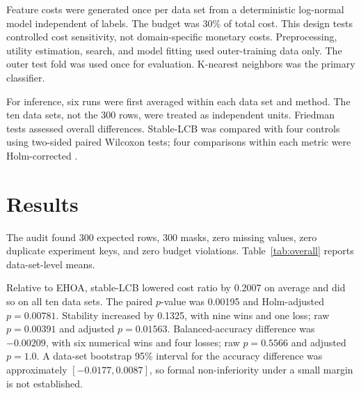 \documentclass[10pt,journal,a4paper]{IEEEtran}
\begin{document}
Feature costs were generated once per data set from a deterministic log-normal model independent of labels. The budget was 30\% of total cost. This design tests controlled cost sensitivity, not domain-specific monetary costs. Preprocessing, utility estimation, search, and model fitting used outer-training data only. The outer test fold was used once for evaluation. K-nearest neighbors was the primary classifier.

For inference, six runs were first averaged within each data set and method. The ten data sets, not the 300 rows, were treated as independent units. Friedman tests assessed overall differences. Stable-LCB was compared with four controls using two-sided paired Wilcoxon tests; four comparisons within each metric were Holm-corrected \cite{demsar2006}.

\section{Results}
The audit found 300 expected rows, 300 masks, zero missing values, zero duplicate experiment keys, and zero budget violations. Table~\ref{tab:overall} reports data-set-level means.

\begin{table}[t]
\caption{Mean results across ten data sets. Higher is better for balanced accuracy and stability; lower is better for cost and size.}
\label{tab:overall}\centering\scriptsize
{}
\end{table}

Relative to EHOA, stable-LCB lowered cost ratio by 0.2007 on average and did so on all ten data sets. The paired $p$-value was 0.00195 and Holm-adjusted $p=0.00781$. Stability increased by 0.1325, with nine wins and one loss; raw $p=0.00391$ and adjusted $p=0.01563$. Balanced-accuracy difference was $-0.00209$, with six numerical wins and four losses; raw $p=0.5566$ and adjusted $p=1.0$. A data-set bootstrap 95\% interval for the accuracy difference was approximately $[-0.0177,0.0087]$, so formal non-inferiority under a small margin is not established.
\end{document}
